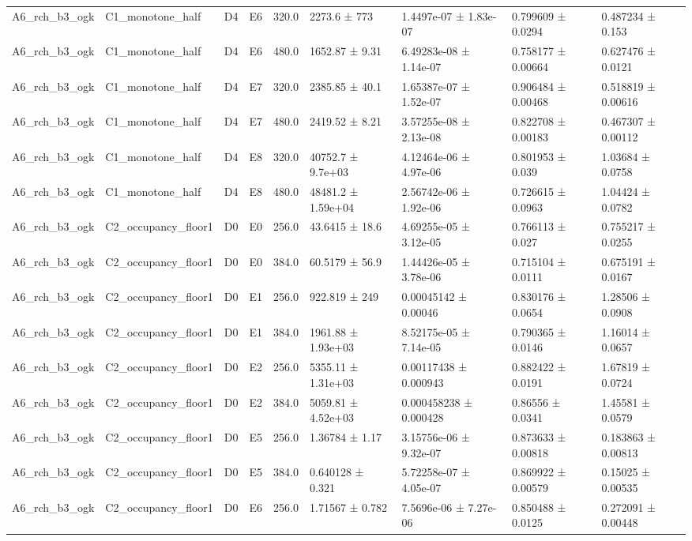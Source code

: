 \begin{table}
\begin{tabular}{lllllllll}
A6\_rch\_b3\_ogk & C1\_monotone\_half & D4 & E6 & 320.0 & 2273.6 ± 773 & 1.4497e-07 ± 1.83e-07 & 0.799609 ± 0.0294 & 0.487234 ± 0.153 \\
A6\_rch\_b3\_ogk & C1\_monotone\_half & D4 & E6 & 480.0 & 1652.87 ± 9.31 & 6.49283e-08 ± 1.14e-07 & 0.758177 ± 0.00664 & 0.627476 ± 0.0121 \\
A6\_rch\_b3\_ogk & C1\_monotone\_half & D4 & E7 & 320.0 & 2385.85 ± 40.1 & 1.65387e-07 ± 1.52e-07 & 0.906484 ± 0.00468 & 0.518819 ± 0.00616 \\
A6\_rch\_b3\_ogk & C1\_monotone\_half & D4 & E7 & 480.0 & 2419.52 ± 8.21 & 3.57255e-08 ± 2.13e-08 & 0.822708 ± 0.00183 & 0.467307 ± 0.00112 \\
A6\_rch\_b3\_ogk & C1\_monotone\_half & D4 & E8 & 320.0 & 40752.7 ± 9.7e+03 & 4.12464e-06 ± 4.97e-06 & 0.801953 ± 0.039 & 1.03684 ± 0.0758 \\
A6\_rch\_b3\_ogk & C1\_monotone\_half & D4 & E8 & 480.0 & 48481.2 ± 1.59e+04 & 2.56742e-06 ± 1.92e-06 & 0.726615 ± 0.0963 & 1.04424 ± 0.0782 \\
A6\_rch\_b3\_ogk & C2\_occupancy\_floor1 & D0 & E0 & 256.0 & 43.6415 ± 18.6 & 4.69255e-05 ± 3.12e-05 & 0.766113 ± 0.027 & 0.755217 ± 0.0255 \\
A6\_rch\_b3\_ogk & C2\_occupancy\_floor1 & D0 & E0 & 384.0 & 60.5179 ± 56.9 & 1.44426e-05 ± 3.78e-06 & 0.715104 ± 0.0111 & 0.675191 ± 0.0167 \\
A6\_rch\_b3\_ogk & C2\_occupancy\_floor1 & D0 & E1 & 256.0 & 922.819 ± 249 & 0.00045142 ± 0.00046 & 0.830176 ± 0.0654 & 1.28506 ± 0.0908 \\
A6\_rch\_b3\_ogk & C2\_occupancy\_floor1 & D0 & E1 & 384.0 & 1961.88 ± 1.93e+03 & 8.52175e-05 ± 7.14e-05 & 0.790365 ± 0.0146 & 1.16014 ± 0.0657 \\
A6\_rch\_b3\_ogk & C2\_occupancy\_floor1 & D0 & E2 & 256.0 & 5355.11 ± 1.31e+03 & 0.00117438 ± 0.000943 & 0.882422 ± 0.0191 & 1.67819 ± 0.0724 \\
A6\_rch\_b3\_ogk & C2\_occupancy\_floor1 & D0 & E2 & 384.0 & 5059.81 ± 4.52e+03 & 0.000458238 ± 0.000428 & 0.86556 ± 0.0341 & 1.45581 ± 0.0579 \\
A6\_rch\_b3\_ogk & C2\_occupancy\_floor1 & D0 & E5 & 256.0 & 1.36784 ± 1.17 & 3.15756e-06 ± 9.32e-07 & 0.873633 ± 0.00818 & 0.183863 ± 0.00813 \\
A6\_rch\_b3\_ogk & C2\_occupancy\_floor1 & D0 & E5 & 384.0 & 0.640128 ± 0.321 & 5.72258e-07 ± 4.05e-07 & 0.869922 ± 0.00579 & 0.15025 ± 0.00535 \\
A6\_rch\_b3\_ogk & C2\_occupancy\_floor1 & D0 & E6 & 256.0 & 1.71567 ± 0.782 & 7.5696e-06 ± 7.27e-06 & 0.850488 ± 0.0125 & 0.272091 ± 0.00448 \\

\end{tabular}
\end{table}
